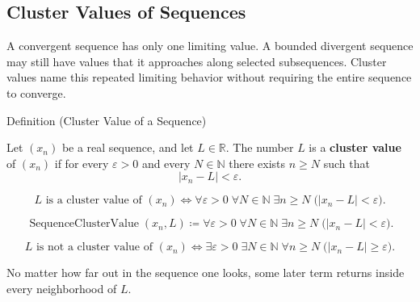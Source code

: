 \subsection*{Cluster Values of Sequences}
\begin{exposition}
A convergent sequence has only one limiting value. A bounded divergent
sequence may still have values that it approaches along selected subsequences.
Cluster values name this repeated limiting behavior without requiring the
entire sequence to converge.
\end{exposition}


\begin{definitionbox}{Definition (Cluster Value of a Sequence)}
\begin{definition}
\label{def:cluster-value-sequence}
Let $(x_n)$ be a real sequence, and let $L\in\mathbb{R}$. The number $L$ is
a \textbf{cluster value} of $(x_n)$ if for every $\varepsilon>0$ and every
$N\in\mathbb{N}$ there exists $n\ge N$ such that
\[
  |x_n-L|<\varepsilon.
\]
\end{definition}
\end{definitionbox}

\begin{remark*}
\[
L\text{ is a cluster value of }(x_n)
\Longleftrightarrow
\forall \varepsilon>0\;\forall N\in\mathbb{N}\;\exists n\ge N
\;\bigl(|x_n-L|<\varepsilon\bigr).
\]
\end{remark*}

\begin{remark*}
\[
\operatorname{SequenceClusterValue}(x_n,L)
\coloneqq
\forall \varepsilon>0\;\forall N\in\mathbb{N}\;\exists n\ge N
\;\bigl(|x_n-L|<\varepsilon\bigr).
\]
\end{remark*}

\begin{remark*}
\[
L\text{ is not a cluster value of }(x_n)
\Longleftrightarrow
\exists \varepsilon>0\;\exists N\in\mathbb{N}\;\forall n\ge N
\;\bigl(|x_n-L|\ge\varepsilon\bigr).
\]
\end{remark*}

\begin{remark*}[Interpretation]
No matter how far out in the sequence one looks, some later term returns
inside every neighborhood of $L$.
\end{remark*}

